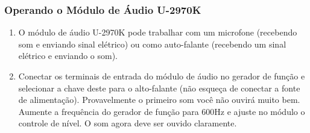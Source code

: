             \subsubsection{Operando o Módulo de Áudio U-2970K}
                \begin{enumerate}
                    \item O módulo de áudio U-2970K pode trabalhar com um microfone (recebendo som e enviando sinal elétrico) ou como auto-falante (recebendo um sinal elétrico e enviando o som).
                    
                    \item Conectar os terminais de entrada do módulo de áudio no gerador de função e selecionar a chave deste para o alto-falante (não esqueça de conectar a fonte de alimentação). Provavelmente o primeiro som você não ouvirá muito bem. Aumente a frequência do gerador de função para 600Hz e ajuste no módulo o controle de nível. O som agora deve ser ouvido claramente.
                \end{enumerate}
                
